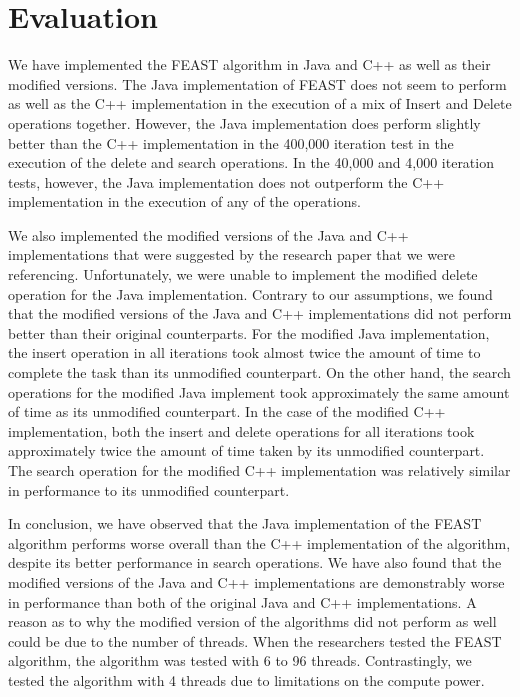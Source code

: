 \documentclass[conference]{IEEEtran}
\begin{document}
\section{Evaluation}
We have implemented the FEAST algorithm in Java and C++ as well as their modified versions. The Java implementation of FEAST does not seem to perform as well as the C++ implementation in the execution of a mix of Insert and Delete operations together. However, the Java implementation does perform slightly better than the C++ implementation in the 400,000 iteration test in the execution of the delete and search operations. In the 40,000 and 4,000 iteration tests, however, the Java implementation does not outperform the C++ implementation in the execution of any of the operations.

We also implemented the modified versions of the Java and C++ implementations that were suggested by the research paper that we were referencing. Unfortunately, we were unable to implement the modified delete operation for the Java implementation. Contrary to our assumptions, we found that the modified versions of the Java and C++ implementations did not perform better than their original counterparts. For the modified Java implementation, the insert operation in all iterations took almost twice the amount of time to complete the task than its unmodified counterpart. On the other hand, the search operations for the modified Java implement took approximately the same amount of time as its unmodified counterpart. In the case of the modified C++ implementation, both the insert and delete operations for all iterations took approximately twice the amount of time taken by its unmodified counterpart. The search operation for the modified C++ implementation was relatively similar in performance to its unmodified counterpart.

In conclusion, we have observed that the Java implementation of the FEAST algorithm performs worse overall than the C++ implementation of the algorithm, despite its better performance in search operations. We have also found that the modified versions of the Java and C++ implementations are demonstrably worse in performance than both of the original Java and C++ implementations. A reason as to why the modified version of the algorithms did not perform as well could be due to the number of threads. When the researchers tested the FEAST algorithm, the algorithm was tested with 6 to 96 threads. Contrastingly, we tested the algorithm with 4 threads due to limitations on the compute power. 
\end{document}
